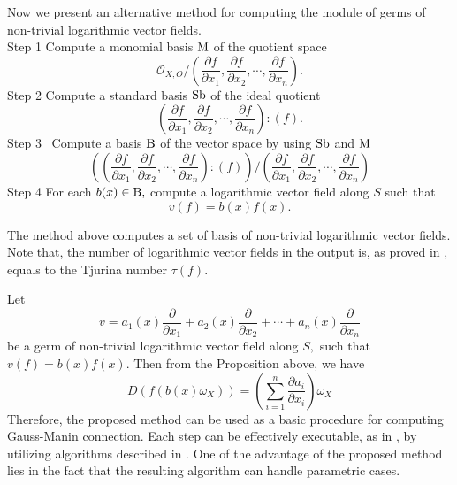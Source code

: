 \documentclass[pdftex]{arxsigma}
\begin{document}
Now we present an alternative method for computing the module of germs of non-trivial logarithmic vector fields. \\

\noindent
{\rm Step 1} Compute a monomial basis ${\rm M} $ of the quotient space 
\begin{equation*}
{\mathcal O}_{X,O}/\left(\frac{\partial f}{\partial x_1}, \frac{\partial f}{\partial x_2}, \cdots, \frac{\partial f}{\partial x_n}\right). 
\end{equation*}
\noindent
{\rm Step 2} Compute a standard basis $ {\rm Sb} $ of the ideal quotient 
\begin{equation*}
\left(\frac{\partial f}{\partial x_1}, \frac{\partial f}{\partial x_2}, \cdots, \frac{\partial f}{\partial x_n}\right) : (f). 
\end{equation*}
\noindent
{\rm Step 3} \ Compute a basis $ {\rm B} $ of the vector space by using $ {\rm Sb} $ and $ {\rm M} $ 
\begin{equation*}
\left(\left(\frac{\partial f}{\partial x_1}, \frac{\partial f}{\partial x_2}, \cdots, \frac{\partial f}{\partial x_n}\right) : (f)\right)/
\left(\frac{\partial f}{\partial x_1}, \frac{\partial f}{\partial x_2}, \cdots, \frac{\partial f}{\partial x_n}\right) 
\end{equation*}
\noindent
{\rm Step 4} For each $ b(x) \in {\rm B}, $ compute a logarithmic vector field along $S$ such that 
\begin{equation*}
v(f)=b(x)f(x). 
\end{equation*}

The method above computes a set of basis of non-trivial logarithmic vector fields. Note that, the number of logarithmic vector fields in the output is, as proved in \cite{M, T}, equals to the Tjurina number $ \tau(f). $ 


 Let 
\begin{equation*}
v=a_1(x)\frac{\partial}{\partial x_1} + a_2(x)\frac{\partial}{\partial x_2}+ \cdots +a_n(x)\frac{\partial}{\partial x_n} 
\end{equation*}
be a germ of  non-trivial logarithmic vector field along $S, $ such that $ v(f) = b(x)f(x). $ Then from the Proposition above, 
we have
\begin{equation*}
D(f(b(x)\omega_X)) =  \left( \sum_{i=1}^{n} \frac{\partial a_i}{\partial x_i} \right) \omega_X 
\end{equation*}
Therefore, the proposed method can be used as a basic procedure for computing Gauss-Manin connection. 
Each step can be effectively executable, as in \cite{TN20},  by utilizing algorithms described in \cite{NT16a,NT16b,NT17a,TNN}. 
One of the advantage of the proposed method  lies in the fact that the resulting algorithm can handle parametric cases. 
\end{document}
